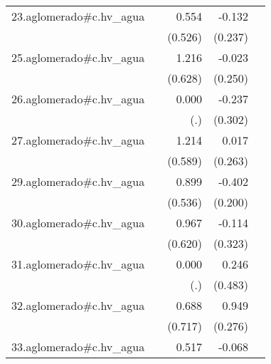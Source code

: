 {\begin{longtable}{l*{4}{D{.}{.}{-1}}}
\addlinespace
23.aglomerado#c.hv\_agua&                     &       0.554         &      -0.132         &                     \\
            &                     &     (0.526)         &     (0.237)         &                     \\
\addlinespace
25.aglomerado#c.hv\_agua&                     &       1.216         &      -0.023         &                     \\
            &                     &     (0.628)         &     (0.250)         &                     \\
\addlinespace
26.aglomerado#c.hv\_agua&                     &       0.000         &      -0.237         &                     \\
            &                     &         (.)         &     (0.302)         &                     \\
\addlinespace
27.aglomerado#c.hv\_agua&                     &       1.214\sym{*}  &       0.017         &                     \\
            &                     &     (0.589)         &     (0.263)         &                     \\
\addlinespace
29.aglomerado#c.hv\_agua&                     &       0.899         &      -0.402\sym{*}  &                     \\
            &                     &     (0.536)         &     (0.200)         &                     \\
\addlinespace
30.aglomerado#c.hv\_agua&                     &       0.967         &      -0.114         &                     \\
            &                     &     (0.620)         &     (0.323)         &                     \\
\addlinespace
31.aglomerado#c.hv\_agua&                     &       0.000         &       0.246         &                     \\
            &                     &         (.)         &     (0.483)         &                     \\
\addlinespace
32.aglomerado#c.hv\_agua&                     &       0.688         &       0.949\sym{***}&                     \\
            &                     &     (0.717)         &     (0.276)         &                     \\
\addlinespace
33.aglomerado#c.hv\_agua&                     &       0.517         &      -0.068         &                     \\

\end{longtable}}
